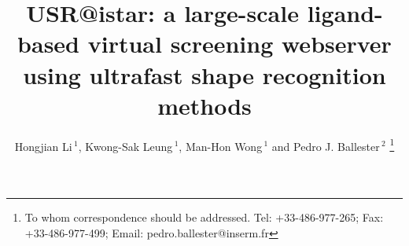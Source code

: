 \documentclass[a4,center,fleqn]{NAR}
\begin{document}
\title{USR@istar: a large-scale ligand-based virtual screening webserver using ultrafast shape recognition methods}

\author{
Hongjian Li\,$^{1}$,
Kwong-Sak Leung\,$^{1}$,
Man-Hon Wong\,$^{1}$
and Pedro J. Ballester\,$^{2}$
\footnote{To whom correspondence should be addressed.
Tel: +33-486-977-265; Fax: +33-486-977-499; Email: pedro.ballester@inserm.fr}}

\address{
$^{1}$Department of Computer Science and Engineering, Chinese University of Hong Kong, Sha Tin, New Territories, Hong Kong
and
$^{2}$Cancer Research Center of Marseille, INSERM U1068, F-13009, Marseille, France. Institut Paoli-Calmettes, F-13009, Marseille, France. Aix-Marseille Université, F-13284, Marseille, France. CNRS UMR7258, F-13009, Marseille, France.}


\maketitle
\end{document}
